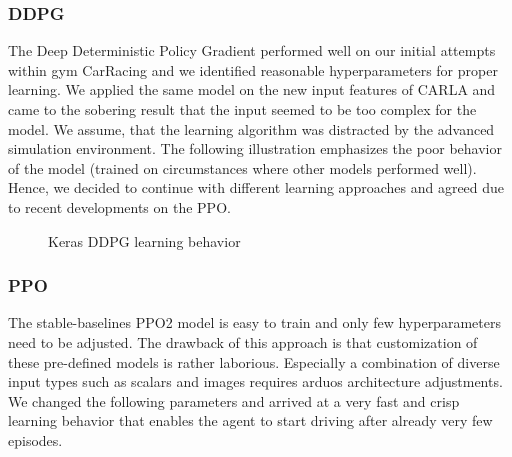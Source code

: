 \documentclass[letterpaper, 10 pt, conference]{ieeeconf}  %
\begin{document}
\subsubsection{DDPG}
The Deep Deterministic Policy Gradient performed well on our initial attempts within gym CarRacing and we identified reasonable hyperparameters for proper learning. We applied the same model on the new input features of CARLA and came to the sobering result that the input seemed to be too complex for the model. We assume, that the learning algorithm was distracted by the advanced simulation environment. The following illustration emphasizes the poor behavior of the model (trained on circumstances where other models performed well). Hence, we decided to continue with different learning approaches and agreed due to recent developments on the PPO.
\begin{figure}[thpb]
	\centering
	\caption{Keras DDPG learning behavior}
	\label{figurelabel}
\end{figure}

\subsubsection{PPO}
The stable-baselines PPO2 model is easy to train and only few hyperparameters need to be adjusted. The drawback of this approach is that customization of these pre-defined models is rather laborious. Especially a combination of diverse input types such as scalars and images requires arduos architecture adjustments. We changed the following parameters and arrived at a very fast and crisp learning behavior that enables the agent to start driving after already very few episodes.
\end{document}
